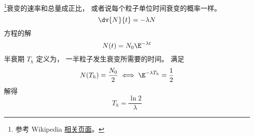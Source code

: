 
\begin{issues}
\issueDraft
\end{issues}



\footnote{参考 Wikipedia \href{https://en.wikipedia.org/wiki/Exponential_decay}{相关页面}。}衰变的速率和总量成正比， 或者说每个粒子单位时间衰变的概率一样。
\begin{equation}
\dv{N}{t} = -\lambda N
\end{equation}
方程的解
\begin{equation}
N(t) = N_0 \E^{-\lambda t}
\end{equation}
半衰期 $T_h$ 定义为， 一半粒子发生衰变所需要的时间。 满足
\begin{equation}
N(T_h) = \frac{N_0}{2} \iff \E^{-\lambda T_h} = \frac{1}{2}
\end{equation}
解得
\begin{equation}
T_h = \frac{\ln 2}{\lambda}
\end{equation}
